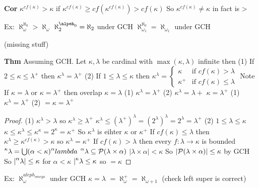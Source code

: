 \textbf{Cor} $\kappa^{cf(\kappa)}>\kappa$
if $\kappa^{cf(\kappa)}\geq cf(\kappa^{cf(\kappa)}) > cf(\kappa)$
So $\kappa^{cf(\kappa)} \neq \kappa$ in fact is >

Ex:
$\aleph_\omega ^ {\aleph_0} > \aleph_\omega$
$\aleph_2 ^ {\alpeh_0} = \aleph_2$ under GCH
$\aleph_{\omega_1}^{\aleph_0} = \aleph_{\omega_1}$ under GCH


(missing stuff)

\textbf{Thm} Assuming GCH. Let $\kappa, \lambda$ be cardinal with $\max(\kappa,\lambda)$ infinite then
(1) If $2 \leq \kappa \leq \lambda^+$ then $\kappa^\lambda = \lambda^+$
(2) If $1 \leq \lambda \leq \kappa$ then $\kappa^\lambda =\begin{cases} \kappa & \text{if } cf(\kappa) > \lambda \\ \kappa^+ & \text{if } cf(\kappa) \leq \lambda \end{cases}$
Note If $\kappa = \lambda$ or $\kappa  = \lambda^+$ then
overlap $\kappa = \lambda$ (1) $\kappa^\lambda = \lambda^+$ (2) $\kappa^\lambda = \lambda+$
$\kappa=\lambda^+$ (1) $\kappa^\lambda = \lambda^+$ (2) $= \kappa = \lambda^+$

\begin{proof}
(1) $\kappa^\lambda > \lambda$ so $\kappa^\lambda \geq \lambda^+$
    $\kappa^\lambda \leq (\lambda^+)^\lambda = (2^\lambda)^\lambda = 2^\lambda = \lambda^+$
(2) $1 \leq \lambda \leq \kappa$
    $\kappa \leq \kappa^\lambda \leq \kappa^\kappa = 2^\kappa = \kappa^+$
    So $\kappa^\lambda$ is eihter $\kappa$ or $\kappa^+$
    If $cf(\kappa) \leq \lambda$ then $\kappa^\lambda \geq \kappa^{cf(\kappa)} > \kappa$ so $\kappa^\lambda = \kappa^+$
    If $cf(\kappa) > \lambda$ then every $f: \lambda \rightarrow \kappa$ is bounded
    $\leftsuperscript{\lambda}{\kappa} = \bigcup(\alpha<\kappa) \leftsuperscript{lambda}{\alpha}$
    $\leftsuperscript{\lambda}{\alpha} \subseteq \PP(\lambda \times \alpha)$
    $|\lambda \times \alpha| < \kappa$
    So $|\mathcal{P}(\lambda \times \alpha)| \leq \kappa$ by GCH
    So $|\leftsuperscript{\lambda}{\alpha}| \leq \kappa$ for $\alpha < \kappa$
    $|\leftsuperscript{\lambda}{\kappa} \leq \kappa$ so $= \kappa$
\end{proof}

Ex: $\aleph_\omega^{aleph_{omega}}$ under GCH
$\kappa = \lambda$
$=\aleph_\omega^+=\aleph_{\omega+1}$
(check left super is correct)